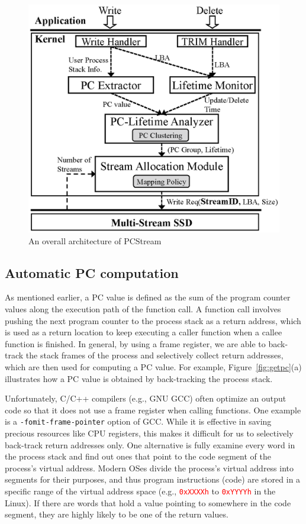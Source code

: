 \begin{figure}[t]
	\centering
	\includegraphics[width=0.8\linewidth]{figure/architecture2}
	\caption{An overall architecture of {\sf PCStream}}
	\label{fig:architecture}
\end{figure}

\subsection{Automatic PC computation}
As mentioned earlier, a PC value is defined as the sum of the program counter
values along the execution path of the function call.  A function call involves
pushing the next program counter to the process stack as a return address,
which  is used as a return location to keep executing a caller function when a
callee function is finished.  In general, by using a frame register, we are
able to back-track the stack frames of the process and selectively collect
return addresses, which are then used for computing a PC value. For example,
Figure~\ref{fig:getpc}(a) illustrates how a PC value is obtained by
back-tracking the process stack.

Unfortunately, C/C++ compilers (e.g., GNU GCC) often optimize an output code so
that it does not use a frame register when calling functions.  One example is a
{\tt -fomit-frame-pointer} option of GCC. While it is effective in saving
precious resources like CPU registers, this makes it difficult for us to
selectively back-track return addresses only. One alternative is fully examine
every word in the process stack and find out ones that point to the code
segment of the process's virtual address.  Modern OSes divide the process's
virtual address into segments for their purposes, and thus program instructions
(code) are stored in a specific range of the virtual address space (e.g.,
\textcolor{red}{\texttt{0xXXXXh}} to \textcolor{red}{\texttt{0xYYYYh}} in the
Linux).  If there are words that hold a value pointing to somewhere in the code
segment, they are highly likely to be one of the return values.  

